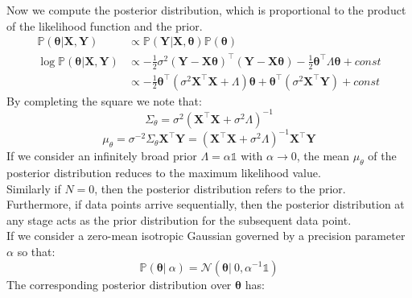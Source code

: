 \documentclass[twoside]{article}
\begin{document}
Now we compute the posterior distribution, which is proportional to the product of the likelihood function and the prior.
\begin{equation*}
\begin{aligned}
    \mathbb{P}(\boldsymbol{\theta}| \boldsymbol{X}, \boldsymbol{Y}) &\propto \mathbb{P}(\boldsymbol{Y}|\boldsymbol{X},\boldsymbol{\theta}) \mathbb{P}(\boldsymbol{\theta})\\
    \log\mathbb{P}(\boldsymbol{\theta}| \boldsymbol{X}, \boldsymbol{Y}) &\propto -\frac{1}{2}\sigma^2(\boldsymbol{Y} - \boldsymbol{X}\boldsymbol{\theta})^\intercal(\boldsymbol{Y} - \boldsymbol{X}\boldsymbol{\theta}) - \frac{1}{2}\boldsymbol{\theta}^\intercal\Lambda\boldsymbol{\theta} + const\\
    &\propto -\frac{1}{2}\boldsymbol{\theta}^\intercal(\sigma^2\boldsymbol{X}^\intercal\boldsymbol{X} + \Lambda)\boldsymbol{\theta} + \boldsymbol{\theta}^\intercal(\sigma^2\boldsymbol{X}^\intercal\boldsymbol{Y}) + const
\end{aligned}
\end{equation*}
By completing the square we note that:
\begin{equation*}
    \Sigma_{\theta} = \sigma^{2}(\boldsymbol{X}^{\intercal}\boldsymbol{X} + \sigma^{2}\Lambda)^{-1}
\end{equation*}
\begin{equation*}
    \mu_{\theta} = \sigma^{-2}\Sigma_{\theta}\boldsymbol{X}^{\intercal}\boldsymbol{Y} = (\boldsymbol{X}^{\intercal}\boldsymbol{X} + \sigma^{2}\Lambda)^{-1}\boldsymbol{X}^{\intercal}\boldsymbol{Y}
\end{equation*}
If we consider an infinitely broad prior $\Lambda = \alpha\mathds{1}$ with $\alpha \to 0$, the mean $\mu_\theta$ of the posterior distribution reduces to the maximum likelihood value.\\
Similarly if $N = 0$, then the posterior distribution refers to the prior.\\
Furthermore, if data points arrive sequentially, then the posterior distribution at any stage acts as the prior distribution for the subsequent data point.\\
If we consider a zero-mean isotropic Gaussian governed by a precision parameter $\alpha$ so that:
\begin{equation*}
    \mathbb{P}(\boldsymbol{\theta}|\:\alpha) = \mathcal{N}(\boldsymbol{\theta}|\:0,\alpha^{-1}\mathds{1})
\end{equation*}
The corresponding posterior distribution over $\boldsymbol{\theta}$ has:
\end{document}
